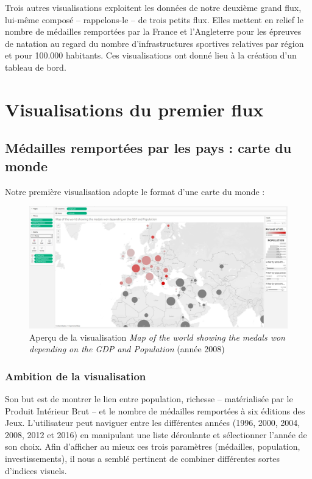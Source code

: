 \documentclass[hidelinks, 12pt]{report}
\begin{document}
Trois autres visualisations exploitent les données de notre deuxième grand flux, lui-même composé -- rappelons-le -- de trois petits flux. Elles mettent en relief le nombre de médailles remportées par la France et l'Angleterre pour les épreuves de natation au regard du nombre d'infrastructures sportives relatives par région et pour 100.000 habitants. Ces visualisations ont donné lieu à la création d'un tableau de bord\autocite{visswim}.

\section{Visualisations du premier flux}

\subsection{Médailles remportées par les pays : carte du monde}

\label{map}Notre première visualisation adopte le format d'une carte du monde :

\begin{center}
	\begin{figure}[H]
		\centering
		\setlength{\belowcaptionskip}{-35pt}
		\includegraphics[scale=0.25]{images/datavis-medals-world-map.jpeg}
		\captionsetup{justification=centering}
		\caption{Aperçu de la visualisation \textit{Map of the world showing the medals won depending on the GDP and Population} (année 2008)}
	\end{figure}
\end{center}

\subsubsection{Ambition de la visualisation}

Son but est de montrer le lien entre population, richesse -- matérialisée par le Produit Intérieur Brut -- et le nombre de médailles remportées à six éditions des Jeux. L'utilisateur peut naviguer entre les différentes années (1996, 2000, 2004, 2008, 2012 et 2016) en manipulant une liste déroulante et sélectionner l'année de son choix. Afin d'afficher au mieux ces trois paramètres (médailles, population, investissements), il nous a semblé pertinent de combiner différentes sortes d'indices visuels.
\end{document}
